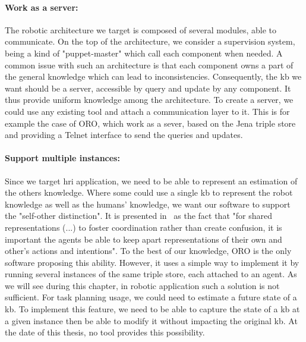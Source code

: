 \paragraph{Work as a server:} The robotic architecture we target is composed of several modules, able to communicate. On the top of the architecture, we consider a supervision system, being a kind of "puppet-master" which call each component when needed. A common issue with such an architecture is that each component owns a part of the general knowledge which can lead to inconsistencies. Consequently, the \acrlong{kb} we want should be a server, accessible by query and update by any component. It thus provide uniform knowledge among the architecture. To create a server, we could use any existing tool and attach a communication layer to it. This is for example the case of ORO, which work as a sever, based on the Jena triple store and providing a Telnet interface to send the queries and updates.

\paragraph{Support multiple instances:} Since we target \acrshort{hri} application, we need to be able to represent an estimation of the others knowledge. Where some could use a single \acrlong{kb} to represent the robot knowledge as well as the humans' knowledge, we want our software to support the "self-other distinction". It is presented in~\cite{pacherie_2012_phenomenology} as the fact that "for shared representations (...) to foster coordination rather than create confusion, it is important the agents be able to keep apart representations of their own and other's actions and intentions". To the best of our knowledge, ORO is the only software proposing this ability. However, it uses a simple way to implement it by running several instances of the same triple store, each attached to an agent. As we will see during this chapter, in robotic application such a solution is not sufficient. For task planning usage, we could need to estimate a future state of a \acrshort{kb}. To implement this feature, we need to be able to capture the state of a \acrshort{kb} at a given instance then be able to modify it without impacting the original \acrshort{kb}. At the date of this thesis, no tool provides this possibility.

